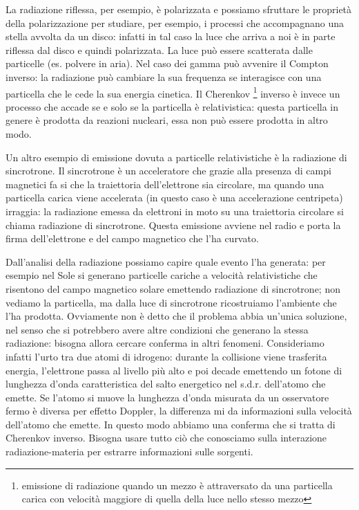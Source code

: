 \documentclass[a4paper,11pt]{article}
\begin{document}
La radiazione riflessa, per esempio, è polarizzata e possiamo sfruttare le proprietà della polarizzazione per studiare, per esempio, i processi che accompagnano una stella avvolta da un disco: infatti in tal caso la luce che arriva a noi è in parte riflessa dal disco e quindi polarizzata.
\newline
La luce può essere scatterata dalle particelle (es. polvere in aria). Nel caso dei gamma può avvenire il Compton inverso: la radiazione può cambiare la sua frequenza se interagisce con una particella che le cede la sua energia cinetica. 
\newline
Il Cherenkov \footnote{emissione di radiazione quando un mezzo è attraversato da una particella carica con velocità maggiore di quella della luce nello stesso mezzo} inverso è invece un processo che accade se e solo se la particella è relativistica: questa particella in genere è prodotta da reazioni nucleari, essa non può essere prodotta in altro modo.

Un altro esempio di emissione dovuta a particelle relativistiche è la radiazione di sincrotrone. Il sincrotrone è un acceleratore che grazie alla presenza di campi magnetici fa si che la traiettoria dell’elettrone sia circolare, ma quando una particella carica viene accelerata (in questo caso è una accelerazione centripeta) irraggia: la radiazione emessa da elettroni in moto su una traiettoria circolare si chiama radiazione di sincrotrone. Questa emissione avviene nel radio e porta la firma dell’elettrone e del campo magnetico che l’ha curvato.

Dall’analisi della radiazione possiamo capire quale evento l’ha generata: per esempio nel Sole si generano particelle cariche a velocità relativistiche che risentono del campo magnetico solare emettendo radiazione di sincrotrone; non vediamo la particella, ma dalla luce di sincrotrone ricostruiamo l’ambiente che l’ha prodotta. Ovviamente non è detto che il problema abbia un’unica soluzione, nel senso che si potrebbero avere altre condizioni che generano la stessa radiazione: bisogna allora cercare conferma in altri fenomeni.
Consideriamo infatti l’urto tra due atomi di idrogeno: durante la collisione viene trasferita energia, l’elettrone passa al livello più alto e poi decade emettendo un fotone di lunghezza d’onda caratteristica del salto energetico nel s.d.r. dell’atomo che emette. Se l’atomo si muove la lunghezza d’onda misurata da un osservatore fermo è diversa per effetto Doppler, la differenza mi da informazioni sulla velocità dell’atomo che emette. In questo modo abbiamo una conferma che si tratta di Cherenkov inverso.
Bisogna usare tutto ciò che conosciamo sulla interazione radiazione-materia per estrarre informazioni sulle sorgenti.
\end{document}
